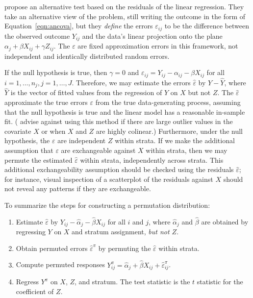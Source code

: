 \documentclass[12pt]{article}
\begin{document}
\citet{freedman_nonstochastic_1983} propose an alternative test based on the residuals of the linear regression.
They take an alternative view of the problem, still writing the outcome in the form of Equation~\ref{eqn:ancova}, but they \textit{define} the errors $\varepsilon_{ij}$ to be the difference between the observed outcome $Y_{ij}$ and the data's linear projection onto the plane $\alpha_j + \beta X_{ij}+ \gamma Z_{ij}$.
The $\varepsilon$ are fixed approximation errors in this framework, not independent and identically distributed random errors.

If the null hypothesis is true, then $\gamma = 0$ and $\varepsilon_{ij} = Y_{ij} - \alpha_{ij} - \beta X_{ij}$ for all $i = 1, \dots, n_j, j = 1, \dots, J$.
Therefore, we may estimate the errors $\hat{\varepsilon}$ by $Y - \hat{Y}$, where $\hat{Y}$ is the vector of fitted values from the regression of $Y$ on $X$ but not $Z$.
The $\hat{\varepsilon}$ approximate the true errors $\varepsilon$ from the true data-generating process, assuming that the null hypothesis is true and the linear model has a reasonable in-sample fit.
(\cite{freedman_nonstochastic_1983} advise against using this method if there are large outlier values in the covariate $X$ or when $X$ and $Z$ are highly colinear.)
Furthermore, under the null hypothesis, the $\varepsilon$ are independent $Z$ within strata. 
If we make the additional assumption that $\varepsilon$ are exchangeable against $X$ within strata, then 
we may permute the estimated $\hat{\varepsilon}$ within strata, independently across strata.
This additional exchangeability assumption should be checked using the residuals $\hat{\varepsilon}$;
for instance, visual inspection of a scatterplot of the residuals against $X$ should not reveal any patterns if they are exchangeable.

To summarize the steps for constructing a permutation distribution:

\begin{enumerate}
\item Estimate $\hat{\varepsilon}$ by $Y_{ij} - \hat{\alpha}_j - \hat{\beta} X_{ij}$ for all $i$ and $j$, where $\hat{\alpha}_j$ and $\hat{\beta}$ are obtained by regressing $Y$ on $X$ and stratum assignment, \textit{but not $Z$}.
\item Obtain permuted errors $\hat{\varepsilon}^\pi$ by permuting the $\hat{\varepsilon}$ within strata.
\item Compute permuted responses $Y_{ij}^\pi = \hat{\alpha}_j + \hat{\beta} X_{ij}+ \hat{\varepsilon}_{ij}^\pi$.
\item Regress $Y^\pi$ on $X$, $Z$, and stratum. The test statistic is the $t$ statistic for the coefficient of $Z$.
\end{enumerate}
\end{document}
